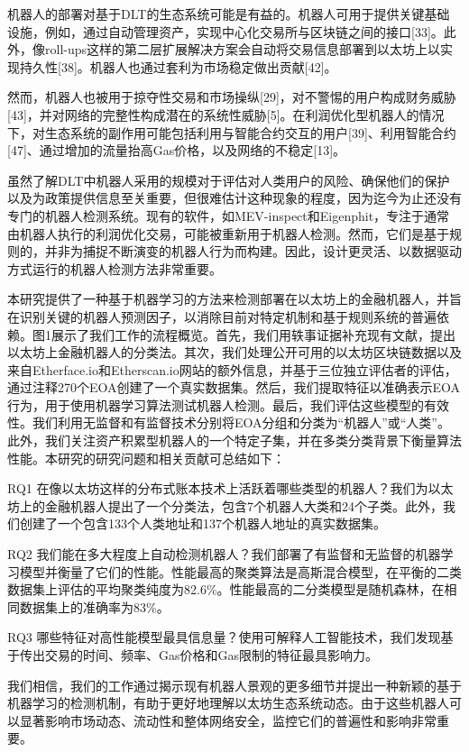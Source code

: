机器人的部署对基于DLT的生态系统可能是有益的。机器人可用于提供关键基础设施，例如，通过自动管理资产，实现中心化交易所与区块链之间的接口[33]。此外，像roll-ups这样的第二层扩展解决方案会自动将交易信息部署到以太坊上以实现持久性[38]。机器人也通过套利为市场稳定做出贡献[42]。

然而，机器人也被用于掠夺性交易和市场操纵[29]，对不警惕的用户构成财务威胁[43]，并对网络的完整性构成潜在的系统性威胁[5]。在利润优化型机器人的情况下，对生态系统的副作用可能包括利用与智能合约交互的用户[39]、利用智能合约[47]、通过增加的流量抬高Gas价格，以及网络的不稳定[13]。

虽然了解DLT中机器人采用的规模对于评估对人类用户的风险、确保他们的保护以及为政策提供信息至关重要，但很难估计这种现象的程度，因为迄今为止还没有专门的机器人检测系统。现有的软件，如MEV-inspect和Eigenphit，专注于通常由机器人执行的利润优化交易，可能被重新用于机器人检测。然而，它们是基于规则的，并非为捕捉不断演变的机器人行为而构建。因此，设计更灵活、以数据驱动方式运行的机器人检测方法非常重要。

本研究提供了一种基于机器学习的方法来检测部署在以太坊上的金融机器人，并旨在识别关键的机器人预测因子，以消除目前对特定机制和基于规则系统的普遍依赖。图1展示了我们工作的流程概览。首先，我们用轶事证据补充现有文献，提出以太坊上金融机器人的分类法。其次，我们处理公开可用的以太坊区块链数据以及来自Etherface.io和Etherscan.io网站的额外信息，并基于三位独立评估者的评估，通过注释270个EOA创建了一个真实数据集。然后，我们提取特征以准确表示EOA行为，用于使用机器学习算法测试机器人检测。最后，我们评估这些模型的有效性。我们利用无监督和有监督技术分别将EOA分组和分类为“机器人”或“人类”。此外，我们关注资产积累型机器人的一个特定子集，并在多类分类背景下衡量算法性能。本研究的研究问题和相关贡献可总结如下：

RQ1 在像以太坊这样的分布式账本技术上活跃着哪些类型的机器人？我们为以太坊上的金融机器人提出了一个分类法，包含7个机器人大类和24个子类。此外，我们创建了一个包含133个人类地址和137个机器人地址的真实数据集。

RQ2 我们能在多大程度上自动检测机器人？我们部署了有监督和无监督的机器学习模型并衡量了它们的性能。性能最高的聚类算法是高斯混合模型，在平衡的二类数据集上评估的平均聚类纯度为82.6\%。性能最高的二分类模型是随机森林，在相同数据集上的准确率为83\%。

RQ3 哪些特征对高性能模型最具信息量？使用可解释人工智能技术，我们发现基于传出交易的时间、频率、Gas价格和Gas限制的特征最具影响力。

我们相信，我们的工作通过揭示现有机器人景观的更多细节并提出一种新颖的基于机器学习的检测机制，有助于更好地理解以太坊生态系统动态。由于这些机器人可以显著影响市场动态、流动性和整体网络安全，监控它们的普遍性和影响非常重要。

